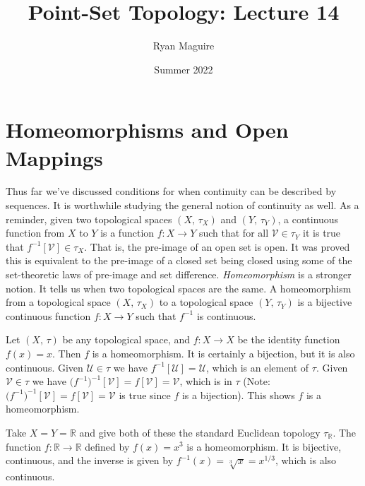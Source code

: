 \documentclass{article}
\title{Point-Set Topology: Lecture 14}
\author{Ryan Maguire}
\date{Summer 2022}
\theoremstyle{plain}
\theoremstyle{normal}
\newenvironment{example}{%
    \pushQED{\qed}\renewcommand{\qedsymbol}{$\blacksquare$}\examplex%
}{%
    \popQED\endexamplex%
}
\newenvironment{definition}{%
    \pushQED{\qed}\renewcommand{\qedsymbol}{$\blacksquare$}\definitionx%
}{%
    \popQED\enddefinitionx%
}
\begin{document}
    \maketitle
    \section{Homeomorphisms and Open Mappings}
        Thus far we've discussed conditions for when continuity can be
        described by sequences. It is worthwhile studying the general notion
        of continuity as well. As a reminder, given two topological spaces
        $(X,\,\tau_{X})$ and $(Y,\,\tau_{Y})$, a continuous function from $X$
        to $Y$ is a function $f:X\rightarrow{Y}$ such that for all
        $\mathcal{V}\in\tau_{Y}$ it is true that
        $f^{-1}[\mathcal{V}]\in\tau_{X}$. That is, the pre-image of an open set
        is open. It was proved this is equivalent to the pre-image of a closed
        set being closed using some of the set-theoretic laws of pre-image and
        set difference. \textit{Homeomorphism} is a stronger notion. It tells
        us when two topological spaces are the same.
        \begin{definition}[\textbf{Homeomorphism}]
            A homeomorphism from a topological space $(X,\,\tau_{X})$ to a
            topological space $(Y,\,\tau_{Y})$ is a bijective continuous
            function $f:X\rightarrow{Y}$ such that $f^{-1}$ is continuous.
        \end{definition}
        \begin{example}
            Let $(X,\,\tau)$ be any topological space, and
            $f:X\rightarrow{X}$ be the identity function $f(x)=x$. Then $f$ is
            a homeomorphism. It is certainly a bijection, but it is also
            continuous. Given $\mathcal{U}\in\tau$ we have
            $f^{-1}[\mathcal{U}]=\mathcal{U}$, which is an element of $\tau$.
            Given $\mathcal{V}\in\tau$ we have
            $\big(f^{-1}\big)^{-1}[\mathcal{V}]=f[\mathcal{V}]=\mathcal{V}$,
            which is in $\tau$ (Note:
            $\big(f^{-1}\big)^{-1}[\mathcal{V}]=f[\mathcal{V}]=\mathcal{V}$
            is true since $f$ is a bijection). This shows $f$ is a
            homeomorphism.
        \end{example}
        \begin{example}
            Take $X=Y=\mathbb{R}$ and give both of these the standard Euclidean
            topology $\tau_{\mathbb{R}}$. The function
            $f:\mathbb{R}\rightarrow\mathbb{R}$ defined by $f(x)=x^{3}$ is
            a homeomorphism. It is bijective, continuous, and the inverse is
            given by $f^{-1}(x)=\sqrt[3]{x}=x^{1/3}$, which is also continuous.
        \end{example}
\end{document}
